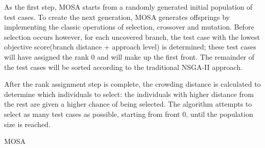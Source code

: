 As the first step, MOSA starts from a randomly generated initial population of test cases. 
To create the next generation, MOSA generates offsprings by implementing the classic operations of selection, crossover and mutation. 
Before selection occurs however, for each uncovered branch, the test case with the lowest objective score(branch distance + approach level) is determined; these test cases will have assigned the rank 0 and will make up the first front. The remainder of the test cases will be sorted according to the traditional NSGA-II approach.

After the rank assignment step is complete, the crowding distance is calculated to determine which individuals to select: the individuals with higher distance from the rest are given a higher chance of being selected. The algorithm attempts to select as many test cases as possible, starting from front 0,  until the population size is reached.



\begin{algorithm}[H]
    \caption{MOSA}


    \DontPrintSemicolon   

\end{algorithm}


